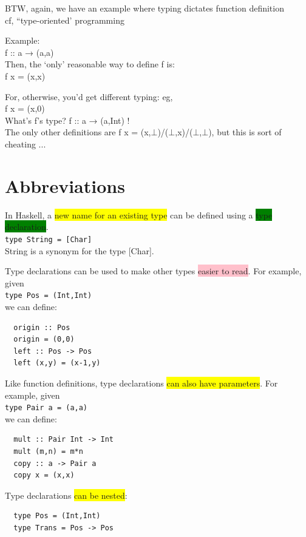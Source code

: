 \documentclass[tikz,border=10pt]{project_plan}
\begin{document}
BTW, again, we have an example where typing dictates function definition\\
cf, “type-oriented’ programming

Example:\\
f :: a → (a,a)\\
Then, the `only’ reasonable way to define f is:\\
f x = (x,x)

For, otherwise, you’d get different typing: eg,\\
f x = (x,0) \\
What’s f’s type? f :: a → (a,Int) !\\
The only other definitions are f x = (x,$\bot$)/($\bot$,x)/($\bot$,$\bot$), but
this is sort of cheating ...

\section{Abbreviations}

In Haskell, a \colorbox{yellow}{new name for an existing type} can be
defined using a \colorbox{green}{type declaration}.\\
\lstinline?type String = [Char]?\\
String is a synonym for the type [Char].

Type declarations can be used to make other types
\colorbox{pink}{easier to read}. For example, given\\
\lstinline?type Pos = (Int,Int)?\\
we can define:\\
\begin{lstlisting}
  origin :: Pos
  origin = (0,0)
  left :: Pos -> Pos
  left (x,y) = (x-1,y)
\end{lstlisting}

Like function definitions, type declarations \colorbox{yellow}{can also have
  parameters}. For example, given\\
\lstinline?type Pair a = (a,a)?\\
we can define:\\
\begin{lstlisting}
  mult :: Pair Int -> Int
  mult (m,n) = m*n
  copy :: a -> Pair a
  copy x = (x,x)
\end{lstlisting}

Type declarations \colorbox{yellow}{can be nested}:
\begin{lstlisting}
  type Pos = (Int,Int)
  type Trans = Pos -> Pos
\end{lstlisting}
\end{document}
